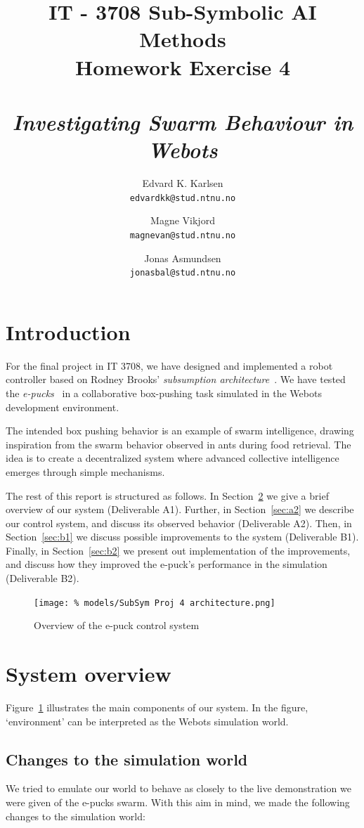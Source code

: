\documentclass[a4paper,10pt]{article}
\title{
    IT - 3708 Sub-Symbolic AI Methods \\
    Homework Exercise 4\\
    ~\\
    \emph{Investigating Swarm Behaviour in Webots}
}
\author{
    Edvard K. Karlsen \\
    \texttt{edvardkk@stud.ntnu.no}
    \and
    Magne Vikjord \\
    \texttt{magnevan@stud.ntnu.no}
    \and
    Jonas Asmundsen \\
    \texttt{jonasbal@stud.ntnu.no}
}
\date {}
\begin{document}
\maketitle

\section{Introduction}
For the final project in IT 3708, we have designed and implemented a robot
controller based on Rodney Brooks' \emph{subsumption
architecture}~\cite{brooks1986}.  We have tested the
\emph{e-pucks}~\cite{bonani2009} in a collaborative box-pushing task simulated
in the Webots development environment.  

The intended box pushing behavior is an example of swarm intelligence, drawing
inspiration from the swarm behavior observed in ants during food retrieval.
The idea is to create a decentralized system where advanced collective
intelligence emerges through simple mechanisms.

The rest of this report is structured as follows. In Section~\ref{sec:a1} we
give a brief overview of our system (Deliverable A1).  Further, in
Section~\ref{sec:a2} we describe our control system, and discuss its observed
behavior (Deliverable A2). Then, in Section~\ref{sec:b1} we discuss possible
improvements to the system (Deliverable B1). Finally, in Section~\ref{sec:b2}
we present out implementation of the improvements, and discuss how they
improved the e-puck's performance in the simulation (Deliverable B2).

\begin{figure}[!h]
  \centering
  \texttt{[image: \%
    models/SubSym Proj 4 architecture.png]}
    \caption{Overview of the e-puck control system}
  \label{fig:architecture}
\end{figure}

\section{System overview}
\label{sec:a1}

Figure~\ref{fig:architecture} illustrates the main components of our system.
In the figure, `environment' can be interpreted as the Webots simulation
world.

\subsection{Changes to the simulation world}
We tried to emulate our world to behave as closely to the live demonstration
we were given of the e-pucks swarm. With this aim in mind, we made the
following changes to the simulation world:
\end{document}
